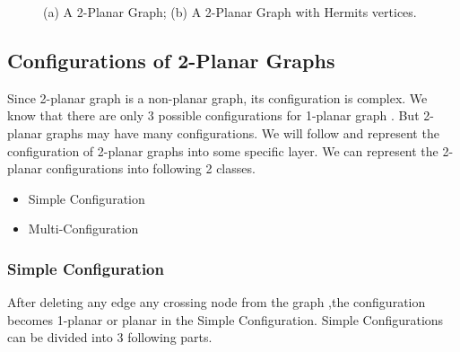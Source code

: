 \begin{figure}[!tb]
  \centering
\resizebox{150mm}{!}{}
\caption{(a) A 2-Planar Graph; (b) A 2-Planar Graph with Hermits vertices.}
\label{fig:2p}
\end{figure}


\subsection{Configurations of 2-Planar Graphs}
\label{sec:c2pg}
Since 2-planar graph is a non-planar graph, its configuration is complex. We know that there are only 3 possible configurations for 1-planar graph \cite{alam}. But 2-planar graphs may have many configurations. We will follow \cite{michael}\cite{Christopher} and represent the configuration of 2-planar graphs into some specific layer. We can represent the 2-planar configurations into following 2 classes.
\begin{itemize}
\item  Simple Configuration
\item  Multi-Configuration
\end{itemize}


\subsubsection{Simple Configuration}
After deleting any edge any crossing node from the graph ,the configuration becomes 1-planar or planar in the Simple Configuration. Simple Configurations can be divided into 3 following parts.

